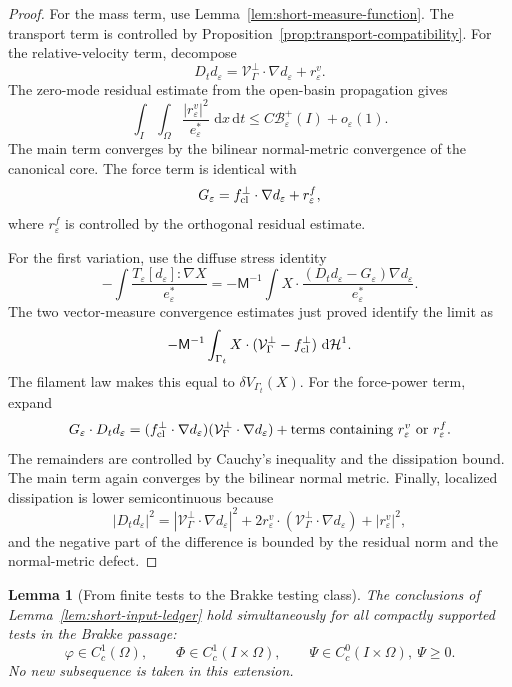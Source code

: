 \documentclass[11pt]{article}
\newtheorem{lemma}[theorem]{Lemma}
\theoremstyle{definition}
\newcommand{\dd}{\,\mathrm d}
\newcommand{\eps}{\varepsilon}
\newcommand{\estar}{e_\varepsilon^\ast}
\newcommand{\Basin}{\mathcal B}
\newcommand{\Mmob}{\mathsf M}
\newcommand{\Vrel}{\mathcal V}
\newcommand{\Hh}{\mathcal H}
\begin{document}
\begin{proof}
For the mass term, use Lemma~\ref{lem:short-measure-function}.  The transport
term is controlled by Proposition~\ref{prop:transport-compatibility}.  For the
relative-velocity term, decompose
\[
        D_td_\eps
        =
        \Vrel_\Gamma^\perp\cdot\nabla d_\eps
        +
        r_\eps^v .
\]
The zero-mode residual estimate from the open-basin propagation gives
\[
        \int_I\!\!\int_\Omega
        \frac{|r_\eps^v|^2}{\estar}\,\dd x\dd t
        \le
        C\Basin_\eps^+(I)+o_\eps(1).
\]
The main term converges by the bilinear normal-metric convergence of the
canonical core.  The force term is identical with
\[
        G_\eps
        =
        f_{\rm cl}^\perp\cdot\nabla d_\eps
        +
        r_\eps^f ,
\]
where \(r_\eps^f\) is controlled by the orthogonal residual estimate.

For the first variation, use the diffuse stress identity
\[
        -\int
        \frac{T_\eps[d_\eps]:\nabla X}{\estar}
        =
        -\Mmob^{-1}
        \int
        X\cdot
        \frac{(D_td_\eps-G_\eps)\nabla d_\eps}{\estar}.
\]
The two vector-measure convergence estimates just proved identify the limit as
\[
        -\Mmob^{-1}
        \int_{\Gamma_t}
        X\cdot
        (\Vrel_\Gamma^\perp-f_{\rm cl}^\perp)\,\dd\Hh^1 .
\]
The filament law makes this equal to \(\delta V_{\Gamma_t}(X)\).  For the
force-power term, expand
\[
        G_\eps\cdot D_td_\eps
        =
        (f_{\rm cl}^\perp\cdot\nabla d_\eps)
        (\Vrel_\Gamma^\perp\cdot\nabla d_\eps)
        +
        \hbox{terms containing }r_\eps^v\hbox{ or }r_\eps^f .
\]
The remainders are controlled by Cauchy's inequality and the dissipation bound.
The main term again converges by the bilinear normal metric.  Finally,
localized dissipation is lower semicontinuous because
\[
        |D_td_\eps|^2
        =
        |\Vrel_\Gamma^\perp\cdot\nabla d_\eps|^2
        +
        2r_\eps^v\cdot(\Vrel_\Gamma^\perp\cdot\nabla d_\eps)
        +
        |r_\eps^v|^2 ,
\]
and the negative part of the difference is bounded by the residual norm and the
normal-metric defect.
\end{proof}

\begin{lemma}[From finite tests to the Brakke testing class]
\label{lem:short-full-testing}
The conclusions of Lemma~\ref{lem:short-input-ledger} hold simultaneously for
all compactly supported tests in the Brakke passage:
\[
        \varphi\in C_c^1(\Omega),\qquad
        \Phi\in C_c^1(I\times\Omega),\qquad
        \Psi\in C_c^0(I\times\Omega),\ \Psi\ge0 .
\]
No new subsequence is taken in this extension.
\end{lemma}
\end{document}
